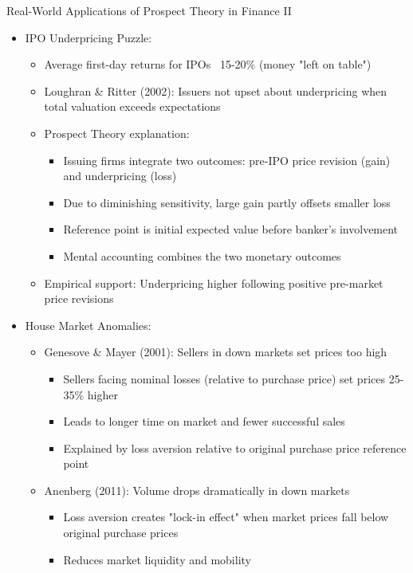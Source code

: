\documentclass[10pt,handout]{beamer}
\begin{document}
\begin{frame}{Real-World Applications of Prospect Theory in Finance II}
  \begin{itemize}[<+->]
    \item IPO Underpricing Puzzle:
      \begin{itemize}
        \item Average first-day returns for IPOs ~15-20\% (money "left on table")
        \item Loughran \& Ritter (2002): Issuers not upset about underpricing when total valuation exceeds expectations
        \item Prospect Theory explanation:
          \begin{itemize}
            \item Issuing firms integrate two outcomes: pre-IPO price revision (gain) and underpricing (loss)
            \item Due to diminishing sensitivity, large gain partly offsets smaller loss
            \item Reference point is initial expected value before banker's involvement
            \item Mental accounting combines the two monetary outcomes
          \end{itemize}
        \item Empirical support: Underpricing higher following positive pre-market price revisions
      \end{itemize}
    \item House Market Anomalies:
      \begin{itemize}
        \item Genesove \& Mayer (2001): Sellers in down markets set prices too high
          \begin{itemize}
            \item Sellers facing nominal losses (relative to purchase price) set prices 25-35\% higher
            \item Leads to longer time on market and fewer successful sales
            \item Explained by loss aversion relative to original purchase price reference point
          \end{itemize}
        \item Anenberg (2011): Volume drops dramatically in down markets
          \begin{itemize}
            \item Loss aversion creates "lock-in effect" when market prices fall below original purchase prices
            \item Reduces market liquidity and mobility
          \end{itemize}
      \end{itemize}
  \end{itemize}
\end{frame}
\end{document}

